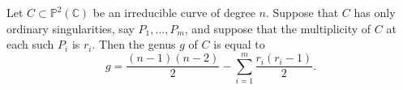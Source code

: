 Let $C \subset \mathbb{P}^2(\mathbb{C})$ be an irreducible curve of degree $n$. Suppose that $C$ has only ordinary singularities, say $P_1, \ldots, P_m$, and suppose that the multiplicity of $C$ at each such $P_i$ is $r_i$. Then the genus $g$ of $C$ is equal to
$$g = \frac{(n-1)(n-2)}{2} - \sum_{i=1}^{m} \frac{r_i(r_i-1)}{2}.$$
